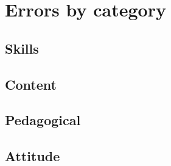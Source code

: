 \documentclass{article}
\begin{document}
\section{Errors by category}

\subsection{Skills}



\subsection{Content}



\subsection{Pedagogical}



\subsection{Attitude}


\end{document}
